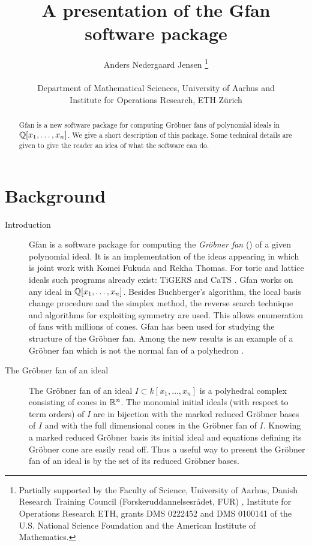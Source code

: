 \documentclass[11pt]{article}
\def\name{Gfan }
\begin{document}
\title{A presentation of the \name software package}
\author{Anders Nedergaard Jensen
\thanks{Partially supported by the Faculty of Science, University of Aarhus, Danish Research Training Council (Forskeruddannelsesr\aa det, FUR) , Institute for Operations Research ETH, grants DMS 0222452 and DMS 0100141 of the U.S. National Science Foundation and the American Institute of Mathematics.
}
\\
\\
\small
Department of Mathematical Sciences, University of Aarhus
and\\
\small
Institute for Operations Research, ETH Z\"urich
}

\maketitle
\begin{abstract}
\name is a new software package for computing Gr\"obner fans of polynomial ideals in $\mathbb{Q}[x_1,\dots,x_n]$.
We give a short description of this package.
Some technical details are given to give the reader an idea of what the software can do.
\end{abstract}


\section{Background}
\begin{description}
\item[Introduction] \name is a software package for computing the \emph{Gr\"obner fan} (\cite{MoRo}) of a given polynomial ideal. It is an implementation of the ideas appearing in \cite{fukuda} which is joint work with Komei Fukuda and Rekha Thomas. For toric and lattice ideals such programs already exist: TiGERS \cite{huber} and CaTS \cite{cats}. \name works on any ideal in $\mathbb{Q}[x_1,\dots,x_n]$. Besides Buchberger's algorithm, the local basis change procedure \cite{collart} and the simplex method, the reverse search technique \cite{avis} and algorithms for exploiting symmetry are used. This allows enumeration of fans with millions of cones. \name has been used for studying the structure of the Gr\"obner fan. Among the new results is an example of a Gr\"obner fan which is not the normal fan of a polyhedron \cite{jensen}.
\item[The Gr\"obner fan of an ideal] The Gr\"obner fan of an ideal $I\subset k[x_1,\dots,x_n]$ is a polyhedral complex consisting of cones in $\mathbb{R}^n$. The monomial initial ideals (with respect to term orders) of $I$ are in bijection with the marked reduced Gr\"obner bases of $I$ and with the full dimensional cones in the Gr\"obner fan of $I$. Knowing a marked reduced Gr\"obner basis its initial ideal and equations defining its Gr\"obner cone are easily read off. Thus a useful way to present the Gr\"obner fan of an ideal is by the set of its reduced Gr\"obner bases.
\end{description}
\end{document}
